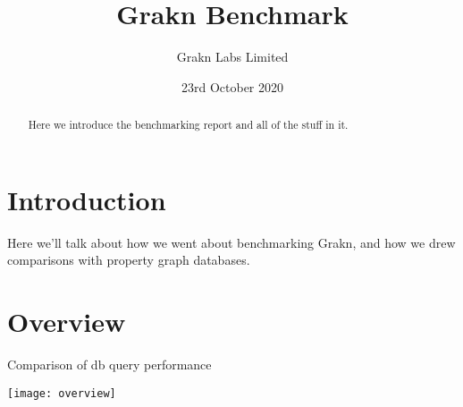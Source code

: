 \documentclass{article}
\begin{document}
\title{Grakn Benchmark}
\date{23rd October 2020}
\author{Grakn Labs Limited}

\maketitle

\begin{abstract}
Here we introduce the benchmarking report and all of the stuff in it.
\end{abstract}

\section{Introduction}
Here we'll talk about how we went about benchmarking Grakn, and how we drew comparisons with property graph databases.

\section{Overview}
Comparison of db query performance

\texttt{[image: overview]}
\end{document}
